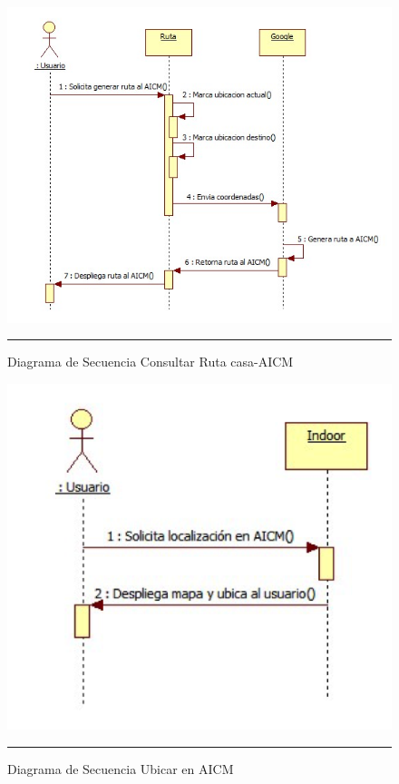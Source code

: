 \begin{figure}[H]
	\centering
		\includegraphics[width=1\textwidth]{Figuras/ruta.jpg}
		\rule{30em}{0.5pt}
	\caption[Diagrama de Secuencia Consultar Ruta casa-AICM]{Diagrama de Secuencia Consultar Ruta casa-AICM}
	\label{fig:secConsultarRutacasa-AICM}
\end{figure}

\begin{figure}[H]
	\centering
		\includegraphics[width=1\textwidth]{Figuras/secUbicarAICM.png}
		\rule{30em}{0.5pt}
	\caption[Diagrama de Secuencia Ubicar en AICM]{Diagrama de Secuencia Ubicar en AICM}
	\label{fig:secUbicarAICM}
\end{figure}

